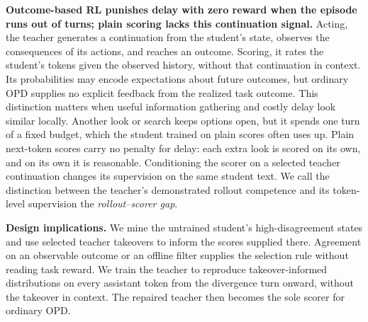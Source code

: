 \textbf{Outcome-based RL punishes delay with zero reward when the episode runs out of turns; plain scoring lacks this continuation signal.} Acting, the teacher generates a continuation from the student's state, observes the consequences of its actions, and reaches an outcome. Scoring, it rates the student's tokens given the observed history, without that continuation in context. Its probabilities may encode expectations about future outcomes, but ordinary OPD supplies no explicit feedback from the realized task outcome. This distinction matters when useful information gathering and costly delay look similar locally. Another look or search keeps options open, but it spends one turn of a fixed budget, which the student trained on plain scores often uses up. Plain next-token scores carry no penalty for delay: each extra look is scored on its own, and on its own it is reasonable. Conditioning the scorer on a selected teacher continuation changes its supervision on the same student text. We call the distinction between the teacher's demonstrated rollout competence and its token-level supervision the \emph{rollout--scorer gap}.

\textbf{Design implications.} We mine the untrained student's high-disagreement states and use selected teacher takeovers to inform the scores supplied there. Agreement on an observable outcome or an offline filter supplies the selection rule without reading task reward. We train the teacher to reproduce takeover-informed distributions on every assistant token from the divergence turn onward, without the takeover in context. The repaired teacher then becomes the sole scorer for ordinary OPD.
